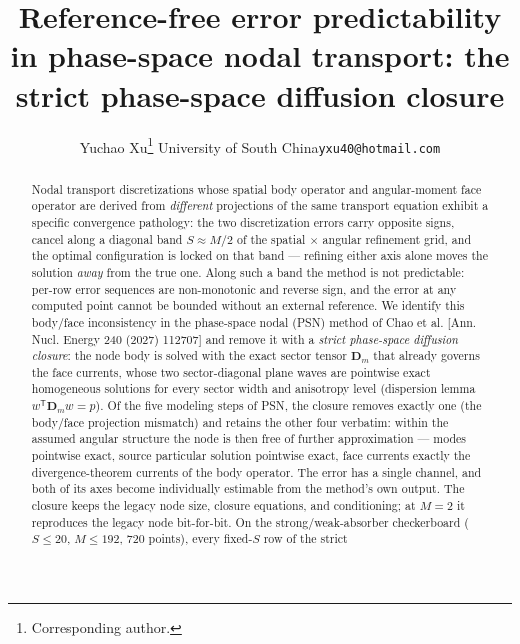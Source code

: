 \documentclass[11pt,a4paper]{article}
\begin{document}
\title{Reference-free error predictability in phase-space nodal
transport: the strict phase-space diffusion closure}
\author{Yuchao Xu\thanks{Corresponding author.}%
\quad University of South China\quad \texttt{yxu40@hotmail.com}}
\date{}
\maketitle
\begin{center}\vspace{-6mm}{\small\it To appear in Annals of Nuclear Energy (preprint)}\end{center}

\begin{abstract}
Nodal transport discretizations whose spatial body operator and
angular-moment face operator are derived from \emph{different}
projections of the same transport equation exhibit a specific
convergence pathology: the two discretization errors carry opposite
signs, cancel along a diagonal band $S \approx M/2$ of the spatial
$\times$ angular refinement grid, and the optimal configuration is
locked on that band --- refining either axis alone moves the solution
\emph{away} from the true one.  Along such a band the method is not
predictable: per-row error sequences are non-monotonic and reverse
sign, and the error at any computed point cannot be bounded without an
external reference.  We identify this body/face inconsistency in the
phase-space nodal (PSN) method of Chao et al. [Ann. Nucl. Energy 240
(2027) 112707] and remove it with a \emph{strict phase-space diffusion
closure}: the node body is solved with the exact sector tensor
$\bm{D}_m$ that already governs the face currents, whose two
sector-diagonal plane waves are pointwise exact homogeneous solutions
for every sector width and anisotropy level (dispersion lemma
$w^{\mathsf T}\bm{D}_m w = p$).  Of the five modeling steps of PSN,
the closure removes exactly one (the body/face projection mismatch)
and retains the other four verbatim: within the assumed angular
structure the node is then free of further approximation --- modes
pointwise exact, source particular solution pointwise exact, face
currents exactly the divergence-theorem currents of the body
operator.  The error has a single channel, and both of its axes become
individually estimable from the method's own output.  The closure keeps the legacy node size,
closure equations, and conditioning; at $M=2$ it reproduces the legacy
node bit-for-bit.  On the strong/weak-absorber checkerboard
($S\le20$, $M\le192$, 720 points), every fixed-$S$ row of the strict

\end{abstract}
\end{document}
